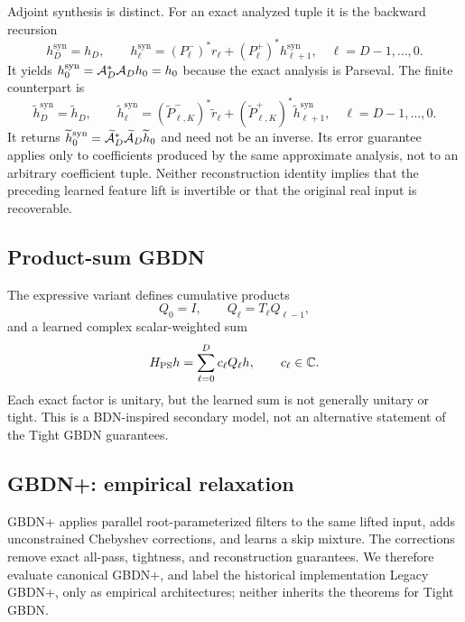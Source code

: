 Adjoint synthesis is distinct.  For an exact analyzed tuple it is the
backward recursion
\begin{equation}
  h_D^{\mathrm{syn}}=h_D,
  \qquad
  h_\ell^{\mathrm{syn}}
  =(P_\ell^-)^*r_\ell+(P_\ell^+)^*h_{\ell+1}^{\mathrm{syn}},
  \quad \ell=D-1,\ldots,0.
  \label{eq:synthesis-recursion}
\end{equation}
It yields $h_0^{\mathrm{syn}}=\mathcal A_D^*\mathcal A_Dh_0=h_0$ because the exact
analysis is Parseval.  The finite counterpart is
\begin{equation}
  \widetilde h_D^{\mathrm{syn}}=\widetilde h_D,
  \qquad
  \widetilde h_\ell^{\mathrm{syn}}
  =(\widetilde P_{\ell,K}^-)^*\widetilde r_\ell
   +(\widetilde P_{\ell,K}^+)^*
     \widetilde h_{\ell+1}^{\mathrm{syn}},
  \quad \ell=D-1,\ldots,0.
  \label{eq:approx-synthesis-recursion}
\end{equation}
It returns
$\widetilde h_0^{\mathrm{syn}}=
\widetilde{\mathcal A}_D^*\widetilde{\mathcal A}_D\widetilde h_0$ and need not be an
inverse.  Its error guarantee applies only to coefficients produced by the
same approximate analysis, not to an arbitrary coefficient tuple.  Neither
reconstruction identity implies that the preceding learned feature lift is
invertible or that the original real input is recoverable.

\subsection{Product-sum GBDN}
\label{sec:method-product-sum}

The expressive variant defines cumulative products
\begin{equation}
  Q_0=I,
  \qquad
  Q_\ell=T_\ell Q_{\ell-1},
\end{equation}
and a learned complex scalar-weighted sum
\begin{equation}
  H_{\mathrm{PS}}h=\sum_{\ell=0}^{D}c_\ell Q_\ell h,
  \qquad c_\ell\in\mathbb C.
  \label{eq:product-sum}
\end{equation}
Each exact factor is unitary, but the learned sum is not generally unitary or
tight.  This is a BDN-inspired secondary model, not an alternative statement
of the Tight GBDN guarantees.

\subsection{GBDN+: empirical relaxation}
\label{sec:method-relaxed}

GBDN+ applies parallel root-parameterized filters to the same lifted input,
adds unconstrained Chebyshev corrections, and learns a skip mixture.  The
corrections remove exact all-pass, tightness, and reconstruction guarantees.
We therefore evaluate canonical GBDN+, and label the historical implementation
Legacy GBDN+, only as empirical architectures; neither inherits the theorems
for Tight GBDN.

